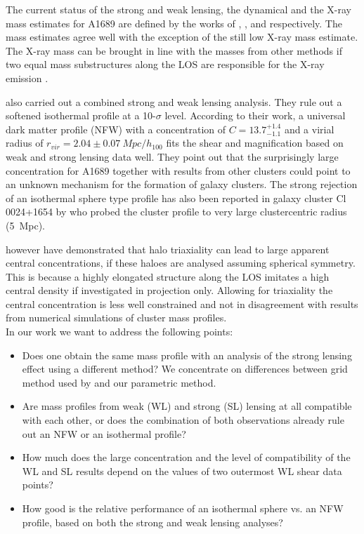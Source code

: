 \documentclass[useAMS,usenatbib]{mn2e}
\newcounter{one}   \setcounter{one}{1}
\newcounter{two}   \setcounter{two}{2}
\begin{document}
The current status of the strong and weak lensing, the dynamical and
the \mbox{X-ray} mass estimates for A1689 are defined by the works of
\citet{broadhurst:05}, \citet{broadhurst:05b}, \citet{girardi:97} and
\citet{andersson:04} respectively. The mass estimates agree well with
the exception of the still low \mbox{X-ray} mass estimate. The
\mbox{X-ray} mass can be brought in line with the masses from other
methods if two equal mass substructures along the LOS are responsible
for the \mbox{X-ray} emission \citep{andersson:04}.

\citet{broadhurst:05b} also carried out a combined strong and weak
lensing analysis.  They rule out a softened isothermal profile at a
10-$\sigma$ level. According to their work, a universal dark matter
profile (NFW) with a concentration of $C=13.7^{+1.4}_{-1.1}$ and a
virial radius of $r_{vir}=2.04\pm0.07~Mpc/h_{100}$ fits the shear and
magnification based on weak and strong lensing data well. They point
out that the surprisingly large concentration for A1689 together with
results from other clusters could point to an unknown mechanism for
the formation of galaxy clusters. The strong rejection of an
isothermal sphere type profile has also been reported in galaxy
cluster Cl 0024+1654 by \citet{kneib:03} who probed the cluster
profile to very large clustercentric radius (5~Mpc).

\citet{oguri:05} however have demonstrated that halo triaxiality can
lead to large apparent central concentrations, if these haloes are
analysed assuming spherical symmetry. This is because a highly
elongated structure along the LOS imitates a high central density if
investigated in projection only. Allowing for triaxiality the central
concentration is less well constrained and not in disagreement with
results from numerical simulations of cluster mass profiles.\\

In our work we want to address the following points:
\begin{itemize}
\item Does one obtain the same mass profile with an analysis of the
strong lensing effect using a different method? We concentrate on
differences between grid method used by \citet{broadhurst:05} and our
parametric method.

\item Are mass profiles from weak (WL) and strong (SL) lensing at all
compatible with each other, or does the combination of both
observations already rule out an NFW or an isothermal profile?

\item How much does the large concentration and the level of
compatibility of the WL and SL results depend on the values of two
outermost WL shear data points?

\item How good is the relative performance of an isothermal sphere
vs. an NFW profile, based on both the strong and weak lensing
analyses?
\end{itemize}
\end{document}
